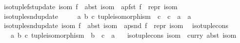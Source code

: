 \begin{isabellebody}
\ \ {\isachardoublequoteopen}iso{\isacharunderscore}{\kern0pt}tuple{\isacharunderscore}{\kern0pt}fst{\isacharunderscore}{\kern0pt}update\ isom\ f\ {\isacharequal}{\kern0pt}\ abst\ isom\ {\isasymcirc}\ apfst\ f\ {\isasymcirc}\ repr\ isom{\isachardoublequoteclose}\isanewline
\isanewline
{}\isamarkupfalse%
\isanewline
\ \ iso{\isacharunderscore}{\kern0pt}tuple{\isacharunderscore}{\kern0pt}snd{\isacharunderscore}{\kern0pt}update\ {\isacharcolon}{\kern0pt}{\isacharcolon}{\kern0pt}\isanewline
\ \ \ \ {\isachardoublequoteopen}{\isacharparenleft}{\kern0pt}{\isacharprime}{\kern0pt}a{\isacharcomma}{\kern0pt}\ {\isacharprime}{\kern0pt}b{\isacharcomma}{\kern0pt}\ {\isacharprime}{\kern0pt}c{\isacharparenright}{\kern0pt}\ tuple{\isacharunderscore}{\kern0pt}isomorphism\ {\isasymRightarrow}\ {\isacharparenleft}{\kern0pt}{\isacharprime}{\kern0pt}c\ {\isasymRightarrow}\ {\isacharprime}{\kern0pt}c{\isacharparenright}{\kern0pt}\ {\isasymRightarrow}\ {\isacharparenleft}{\kern0pt}{\isacharprime}{\kern0pt}a\ {\isasymRightarrow}\ {\isacharprime}{\kern0pt}a{\isacharparenright}{\kern0pt}{\isachardoublequoteclose}\ \isanewline
\ \ {\isachardoublequoteopen}iso{\isacharunderscore}{\kern0pt}tuple{\isacharunderscore}{\kern0pt}snd{\isacharunderscore}{\kern0pt}update\ isom\ f\ {\isacharequal}{\kern0pt}\ abst\ isom\ {\isasymcirc}\ apsnd\ f\ {\isasymcirc}\ repr\ isom{\isachardoublequoteclose}\isanewline
\isanewline
{}\isamarkupfalse%
\isanewline
\ \ iso{\isacharunderscore}{\kern0pt}tuple{\isacharunderscore}{\kern0pt}cons\ {\isacharcolon}{\kern0pt}{\isacharcolon}{\kern0pt}\isanewline
\ \ \ \ {\isachardoublequoteopen}{\isacharparenleft}{\kern0pt}{\isacharprime}{\kern0pt}a{\isacharcomma}{\kern0pt}\ {\isacharprime}{\kern0pt}b{\isacharcomma}{\kern0pt}\ {\isacharprime}{\kern0pt}c{\isacharparenright}{\kern0pt}\ tuple{\isacharunderscore}{\kern0pt}isomorphism\ {\isasymRightarrow}\ {\isacharprime}{\kern0pt}b\ {\isasymRightarrow}\ {\isacharprime}{\kern0pt}c\ {\isasymRightarrow}\ {\isacharprime}{\kern0pt}a{\isachardoublequoteclose}\ \isanewline
\ \ {\isachardoublequoteopen}iso{\isacharunderscore}{\kern0pt}tuple{\isacharunderscore}{\kern0pt}cons\ isom\ {\isacharequal}{\kern0pt}\ curry\ {\isacharparenleft}{\kern0pt}abst\ isom{\isacharparenright}{\kern0pt}{\isachardoublequoteclose}%
\isadelimdocument
%
\endisadelimdocument
%
\isatagdocument
%
\isamarkuptrue%
%
\endisatagdocument
{\isafolddocument}%
%
\isadelimdocument
%
\endisadelimdocument
{}\isamarkupfalse%

\end{isabellebody}
